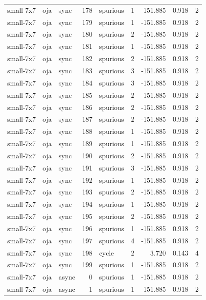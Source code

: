 \begin{tabular}{lllrlrrrr}
small-7x7 & oja & sync & 178 & spurious & 1 & -151.885 & 0.918 & 2 \\
small-7x7 & oja & sync & 179 & spurious & 1 & -151.885 & 0.918 & 2 \\
small-7x7 & oja & sync & 180 & spurious & 2 & -151.885 & 0.918 & 2 \\
small-7x7 & oja & sync & 181 & spurious & 1 & -151.885 & 0.918 & 2 \\
small-7x7 & oja & sync & 182 & spurious & 2 & -151.885 & 0.918 & 2 \\
small-7x7 & oja & sync & 183 & spurious & 3 & -151.885 & 0.918 & 2 \\
small-7x7 & oja & sync & 184 & spurious & 3 & -151.885 & 0.918 & 2 \\
small-7x7 & oja & sync & 185 & spurious & 2 & -151.885 & 0.918 & 2 \\
small-7x7 & oja & sync & 186 & spurious & 2 & -151.885 & 0.918 & 2 \\
small-7x7 & oja & sync & 187 & spurious & 2 & -151.885 & 0.918 & 2 \\
small-7x7 & oja & sync & 188 & spurious & 1 & -151.885 & 0.918 & 2 \\
small-7x7 & oja & sync & 189 & spurious & 1 & -151.885 & 0.918 & 2 \\
small-7x7 & oja & sync & 190 & spurious & 2 & -151.885 & 0.918 & 2 \\
small-7x7 & oja & sync & 191 & spurious & 3 & -151.885 & 0.918 & 2 \\
small-7x7 & oja & sync & 192 & spurious & 1 & -151.885 & 0.918 & 2 \\
small-7x7 & oja & sync & 193 & spurious & 2 & -151.885 & 0.918 & 2 \\
small-7x7 & oja & sync & 194 & spurious & 1 & -151.885 & 0.918 & 2 \\
small-7x7 & oja & sync & 195 & spurious & 2 & -151.885 & 0.918 & 2 \\
small-7x7 & oja & sync & 196 & spurious & 1 & -151.885 & 0.918 & 2 \\
small-7x7 & oja & sync & 197 & spurious & 4 & -151.885 & 0.918 & 2 \\
small-7x7 & oja & sync & 198 & cycle & 2 & 3.720 & 0.143 & 4 \\
small-7x7 & oja & sync & 199 & spurious & 1 & -151.885 & 0.918 & 2 \\
small-7x7 & oja & async & 0 & spurious & 1 & -151.885 & 0.918 & 2 \\
small-7x7 & oja & async & 1 & spurious & 1 & -151.885 & 0.918 & 2 \\

\end{tabular}
